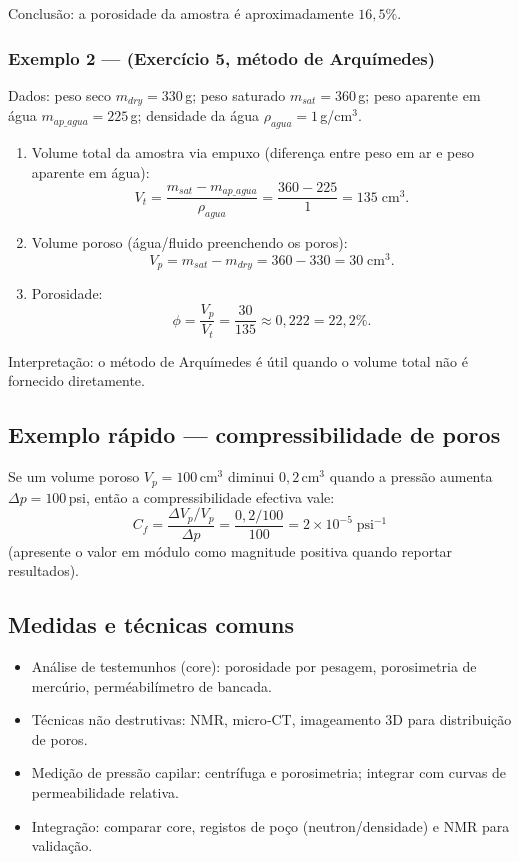 \documentclass[11pt,a4paper]{article}
\begin{document}
Conclusão: a porosidade da amostra é aproximadamente $16{,}5\%$.

\subsubsection{Exemplo 2 — (Exercício 5, método de Arquímedes)}
Dados: peso seco $m_{dry}=330\,$g; peso saturado $m_{sat}=360\,$g; peso aparente em água $m_{ap\_agua}=225\,$g; densidade da água $\rho_{agua}=1\,$g/cm$^3$.

\begin{enumerate}
\item Volume total da amostra via empuxo (diferença entre peso em ar e peso aparente em água):
$$
V_t = \dfrac{m_{sat}-m_{ap\_agua}}{\rho_{agua}} = \dfrac{360-225}{1} = 135\;\text{cm}^3.
$$
\item Volume poroso (água/fluido preenchendo os poros):
$$
V_p = m_{sat}-m_{dry} = 360-330 = 30\;\text{cm}^3.
$$
\item Porosidade:
$$
\phi = \dfrac{V_p}{V_t} = \dfrac{30}{135} \approx 0{,}222 = 22{,}2\%.
$$
\end{enumerate}

Interpretação: o método de Arquímedes é útil quando o volume total não é fornecido diretamente.

\subsection{Exemplo rápido — compressibilidade de poros}
Se um volume poroso $V_p=100\,$cm$^3$ diminui $0{,}2\,$cm$^3$ quando a pressão aumenta $\Delta p=100\,$psi, então a compressibilidade efectiva vale:
$$
C_f = \dfrac{\Delta V_p/V_p}{\Delta p} = \dfrac{0{,}2/100}{100} = 2\times10^{-5}\;\text{psi}^{-1}
$$
(apresente o valor em módulo como magnitude positiva quando reportar resultados).

\subsection{Medidas e técnicas comuns}
\begin{itemize}
\item Análise de testemunhos (core): porosidade por pesagem, porosimetria de mercúrio, perméabilímetro de bancada.
\item Técnicas não destrutivas: NMR, micro‑CT, imageamento 3D para distribuição de poros.
\item Medição de pressão capilar: centrífuga e porosimetria; integrar com curvas de permeabilidade relativa.
\item Integração: comparar core, registos de poço (neutron/densidade) e NMR para validação.
\end{itemize}
\end{document}

